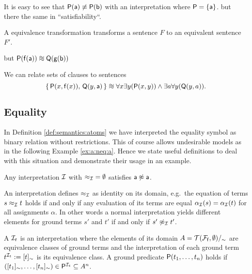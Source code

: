 \begin{example}
	It is easy to see that \( \mathsf{P}(\mathsf{a}) \not\equiv \mathsf{P}(\mathsf{b}) \) with
	an interpretation where \( \mathsf{P} = \{ \mathsf{a} \} \).
	but there the same in “satisfiability“.
\end{example}

\begin{definition}
	A equivalence transformation transforms
	a sentence \( F \) to an equivalent sentence \( F' \).
\end{definition}

 but \( \mP(\mf(\ma)) \equisat \mQ(\mg(\mb)) \)


\begin{example}We can relate sets of clauses to sentences
	\[
	\{\,\mP(x, \mf(x)),\,\mQ(y,\ma)\,\} \equisat \forall x\exists y(\mP(x,y)) \land \exists a\forall y(\mQ(y,a)) .
	\]
\end{example}



\subsection{Equality}

In Definition \ref{def:semantics:atoms} we have interpreted the equality symbol as binary relation without restrictions.
This of course allows undesirable models as in the following Example \ref{ex:a:neq:a}.
Hence we state useful definitions to deal with this situation and demonstrate their usage in an example.

\begin{example}
	\label{ex:a:neq:a}
	Any interpretation \( \mathcal{I} \)
	with \( {\approx_{\mathcal{I}}} = \emptyset \) satisfies \( \mathsf{a}\not\approx\mathsf{a} \).
\end{example}

\begin{definition}\label{def:normal:interpreation}
	An  interpretation defines \( \approx_{\mathcal{I}} \) as identity on its domain,
	e.g.~the equation of terms \( s \approx_{\mathcal{I}} t \) holds if and only
	if any evaluation of its terms are equal \( \alpha_{\mathcal{I}}(s) = \alpha_{\mathcal{I}}(t) \)
	for all assignments \( \alpha \).
	In other words a normal interpretation yields different elements
	for ground terms \( s' \) and \( t' \) if and only if \( s'\not\approx_{\mathcal{I}} t' \).
\end{definition}

\begin{definition}
	A 
	\( \mathcal{I}_t \)
	is an interpretation
	where the elements of its domain \( A = {\mathcal{T}(\mathcal{F}_{\mathsf{f}},\emptyset)}/_\sim \)
	are equivalence classes of ground terms
	and the interpretation of each ground term \( t^{\mathcal{I}_t} := [t]_\sim \) is its equivalence class.
	A ground predicate \( \mathsf{P}(t_1,\ldots,t_n) \) holds if
	\( ([t_1]_\sim,\ldots,[t_n]_\sim) \in \mathsf{P}^{\mathcal{I}_t} \subseteq A^n \).
\end{definition}



